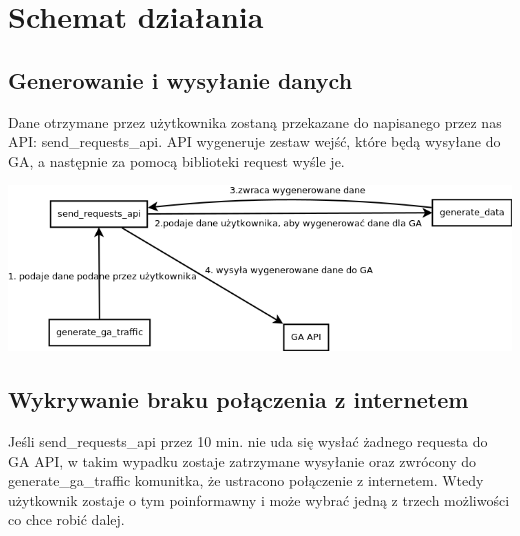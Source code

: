 \documentclass{article}
\begin{document}
\section{Schemat działania}

\subsection{Generowanie i wysyłanie danych}
Dane otrzymane przez użytkownika zostaną przekazane do napisanego przez nas API: send\_requests\_api. API wygeneruje zestaw wejść, które będą wysyłane do GA, a następnie za pomocą biblioteki request wyśle je.

\includegraphics[scale=0.5]{connection_ga}

\subsection{Wykrywanie braku połączenia z internetem}
Jeśli send\_requests\_api przez 10 min. nie uda się wysłać żadnego requesta do GA API, w takim wypadku zostaje zatrzymane wysyłanie oraz zwrócony do generate\_ga\_traffic komunitka, że ustracono połączenie z internetem. Wtedy użytkownik zostaje o tym poinformawny i może wybrać jedną z trzech możliwości co chce robić dalej.
\end{document}
